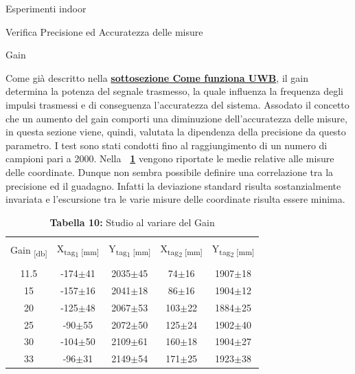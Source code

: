 \documentclass[12pt]{report}
\begin{document}
\begin{section}{Esperimenti indoor}
\begin{subsection}{Verifica Precisione ed Accuratezza delle misure}
		\begin{subsubsection}{Gain}

			Come  già descritto nella \hyperlink{SS5}{\textbf{sottosezione Come funziona UWB}}, il gain determina la potenza del segnale trasmesso, la quale influenza la frequenza degli impulsi trasmessi e di conseguenza l'accuratezza del sistema. Assodato il concetto che un aumento del gain comporti una diminuzione					dell'accuratezza delle misure, in questa sezione viene, quindi, valutata la dipendenza della precisione da questo parametro. I test sono stati condotti fino al raggiungimento di un numero di campioni pari a 2000. Nella \textbf{\tablename~\ref{TGainP}} vengono riportate le medie relative alle misure 									delle coordinate.  Dunque non sembra possibile definire una correlazione tra la precisione ed il guadagno. Infatti la deviazione standard risulta sostanzialmente invariata e l'escursione tra le varie misure delle coordinate risulta essere minima. 

		\begin{table}[h]
					\centering
					\footnotesize
					\begin{tabular}{|c|c|c|c|c|}
						\hline
						&&&&\\
						Gain\textsubscript{ [db]}&		X\textsubscript{tag\textsubscript{1} [mm]}&	Y\textsubscript{tag\textsubscript{1} [mm]}&		X\textsubscript{tag\textsubscript{2} [mm]}&	Y\textsubscript{tag\textsubscript{2} [mm]}\\
						&&&&\\
						\hline
						11.5&			-174$\pm$41&				2035$\pm$45&									74$\pm$16&												1907$\pm$18\\ 
						\hline
						15&				-157$\pm$16&				2041$\pm$18&									86$\pm$16&												1904$\pm$12\\ 
						\hline
						20&				-125$\pm$48&				2067$\pm$53&									103$\pm$22&											1884$\pm$25\\ 
						\hline
						25&				-90$\pm$55&				2072$\pm$50&									125$\pm$24&											1902$\pm$40\\ 
						\hline
						30&				-104$\pm$50&				2109$\pm$61&									160$\pm$18&											1904$\pm$27\\ 
						\hline
						33&				-96$\pm$31&				2149$\pm$54&									171$\pm$25&											1923$\pm$38\\ 
						\hline
					\end{tabular}
					\caption{\textbf{Tabella 10: } Studio al variare del Gain\label{TGainP}}
		\end{table}
		

\end{subsubsection}
\end{subsection}
\end{section}
\end{document}
